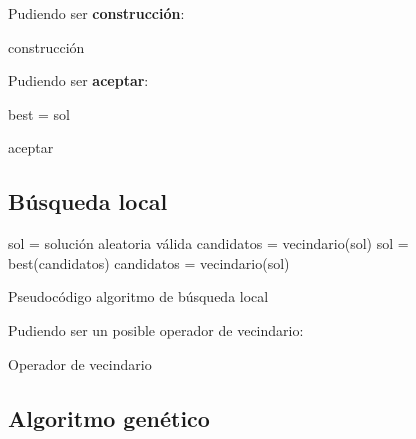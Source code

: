 \documentclass[13pt,a4paper]{article}
\begin{document}
\vspace{\baselineskip}

Pudiendo ser \textbf{construcción}:

\begin{algorithm}[H]
    \SetAlgoLined
    \caption{construcción}
\end{algorithm}

\vspace{\baselineskip}

Pudiendo ser \textbf{aceptar}:

\begin{algorithm}[H]
    \SetAlgoLined
        best = sol \;
    \caption{aceptar}
\end{algorithm}


\newpage

\subsection{Búsqueda local}

\begin{algorithm}[H]
    \SetAlgoLined
        sol = solución aleatoria válida \;
        candidatos = vecindario(sol) \;
         {
            sol = best(candidatos) \;
            candidatos = vecindario(sol) \;
        }        
    \caption{Pseudocódigo algoritmo de búsqueda local}
\end{algorithm}

\vspace{\baselineskip}

Pudiendo ser un posible operador de vecindario:

\begin{algorithm}[H]
    \SetAlgoLined
    \caption{Operador de vecindario}
\end{algorithm}


\subsection{Algoritmo genético}
\end{document}
